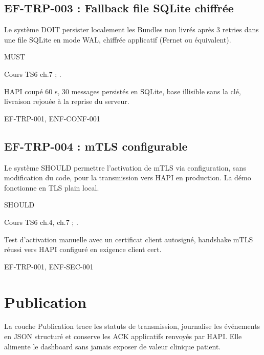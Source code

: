 \subsection*{EF-TRP-003 : Fallback file SQLite chiffrée}
\begin{description}[leftmargin=2.5cm, style=nextline]
  \item[Énoncé] Le système DOIT persister localement les Bundles non livrés après 3 retries dans une file SQLite en mode WAL, chiffrée applicatif (Fernet ou équivalent).
  \item[Priorité] MUST
  \item[Source] Cours TS6 ch.7 ; \cite{ihe_pcd_tf}.
  \item[Recette] HAPI coupé 60 s, 30 messages persistés en SQLite, base illisible sans la clé, livraison rejouée à la reprise du serveur.
  \item[Lié à] EF-TRP-001, ENF-CONF-001
\end{description}

\subsection*{EF-TRP-004 : mTLS configurable}
\begin{description}[leftmargin=2.5cm, style=nextline]
  \item[Énoncé] Le système SHOULD permettre l'activation de mTLS via configuration, sans modification du code, pour la transmission vers HAPI en production. La démo fonctionne en TLS plain local.
  \item[Priorité] SHOULD
  \item[Source] Cours TS6 ch.4, ch.7 ; \cite{ihe_pcd_tf}.
  \item[Recette] Test d'activation manuelle avec un certificat client autosigné, handshake mTLS réussi vers HAPI configuré en exigence client cert.
  \item[Lié à] EF-TRP-001, ENF-SEC-001
\end{description}

\section{Publication}
\label{sec:ef-publication}

La couche Publication trace les statuts de transmission, journalise les événements en JSON structuré et conserve les ACK applicatifs renvoyés par HAPI. Elle alimente le dashboard sans jamais exposer de valeur clinique patient.

